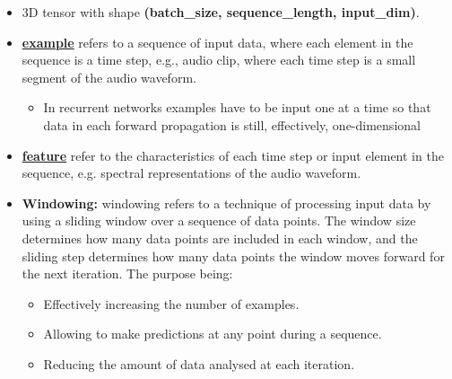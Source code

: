 \documentclass[a4paper,10pt]{article}
\begin{document}
\begin{itemize}
    \item 3D tensor with shape \textbf{(batch\_size, sequence\_length, input\_dim)}.
    \item \underline{\textbf{example}} refers to a sequence of input data, where each element in the sequence is a time step, e.g., audio clip, where each time step is a small segment of the audio waveform.
        \begin{itemize}
            \item In recurrent networks examples have to be input one at a time so that data in each forward propagation is still, effectively, one-dimensional
        \end{itemize}
    \item \underline{\textbf{feature}} refer to the characteristics of each time step or input element in the sequence, e.g. spectral representations of the audio waveform.
    \item \textbf{Windowing:} windowing refers to a technique of processing input data by using a sliding window over a sequence of data points. The window size determines how many data points are included in each window, and the sliding step determines how many data points the window moves forward for the next iteration. The purpose being:
        \begin{itemize}
            \item Effectively increasing the number of examples.
            \item Allowing to make predictions at any point during a sequence.
            \item Reducing the amount of data analysed at each iteration.
        \end{itemize}
\end{itemize}
\end{document}
